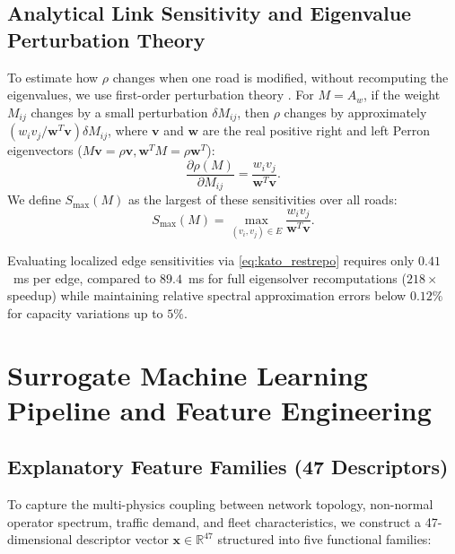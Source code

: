 \documentclass[journal]{IEEEtran}
\begin{document}
\subsection{Analytical Link Sensitivity and Eigenvalue Perturbation Theory}
To estimate how $\rho$ changes when one road is modified, without recomputing the eigenvalues, we use first-order perturbation theory \cite{Restrepo2006}. For $M = A_w$, if the weight $M_{ij}$ changes by a small perturbation $\delta M_{ij}$, then $\rho$ changes by approximately $(w_i v_j / \mathbf{w}^T \mathbf{v}) \delta M_{ij}$, where $\mathbf{v}$ and $\mathbf{w}$ are the real positive right and left Perron eigenvectors ($M \mathbf{v} = \rho \mathbf{v}, \mathbf{w}^T M = \rho \mathbf{w}^T$):
\begin{equation}
\frac{\partial \rho(M)}{\partial M_{ij}} = \frac{w_i v_j}{\mathbf{w}^T \mathbf{v}}.
\label{eq:kato_restrepo}
\end{equation}
We define $S_{\max}(M)$ as the largest of these sensitivities over all roads:
\begin{equation}
S_{\max}(M) = \max_{(v_i, v_j) \in E} \frac{w_i v_j}{\mathbf{w}^T \mathbf{v}}.
\label{eq:max_link_sensitivity}
\end{equation}

Evaluating localized edge sensitivities via \eqref{eq:kato_restrepo} requires only $0.41$~ms per edge, compared to $89.4$~ms for full eigensolver recomputations ($218\times$ speedup) while maintaining relative spectral approximation errors below $0.12\%$ for capacity variations up to $5\%$.

\section{Surrogate Machine Learning Pipeline and Feature Engineering}

\subsection{Explanatory Feature Families (47 Descriptors)}
To capture the multi-physics coupling between network topology, non-normal operator spectrum, traffic demand, and fleet characteristics, we construct a 47-dimensional descriptor vector $\mathbf{x} \in \mathbb{R}^{47}$ structured into five functional families:
\end{document}

